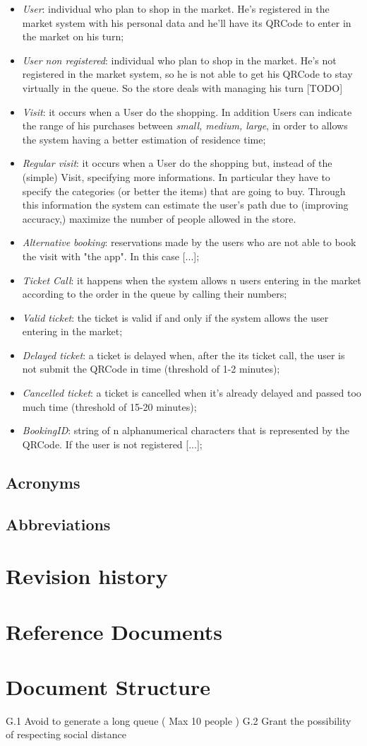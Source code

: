 \begin{itemize}
\item \textit{User}: individual who plan to shop in the market. He's registered in the market system with his personal data and he'll have its QRCode to enter in the market on his turn;
\item \textit{User non registered}: individual who plan to shop in the market. He's not registered in the market system, so he is not able to get his QRCode to stay virtually in the queue. So the store deals with managing his turn [TODO]
\item \textit{Visit}: it occurs when a User do the shopping. In addition Users can indicate the range of his purchases between  \textit{small, medium, large}, in order to allows the system having a better estimation of residence time;
\item \textit{Regular visit}: it occurs when a User do the shopping but, instead of the (simple) Visit, specifying more informations. In particular they have to specify the categories (or better the items) that are going to buy. Through this information the system can estimate the user's path due to (improving accuracy,) maximize the number of people allowed in the store.
\item \textit{Alternative booking}: reservations made by the users who are not able to book the visit with "the app". In this case [...];
\item \textit{Ticket Call}: it happens when the system allows n users entering in the market according to the order in the queue by calling their numbers;
\item \textit{Valid ticket}: the ticket is valid if and only if the system allows the user entering in the market;
\item \textit{Delayed ticket}: a ticket is delayed when, after the its ticket call, the user is not submit the QRCode in time (threshold of 1-2 minutes);
\item \textit{Cancelled ticket}: a ticket is cancelled when it's already delayed and passed too much time (threshold of 15-20 minutes);
\item \textit{BookingID}: string of n alphanumerical characters that is represented by the QRCode. If the user is not registered [...];
\end{itemize}



\subsection{Acronyms}
\subsection{Abbreviations}

\section{Revision history}

\section{Reference Documents}

\section{Document Structure}
G.1 Avoid to generate a long queue ( Max 10 people )
G.2 Grant the possibility of respecting social distance
